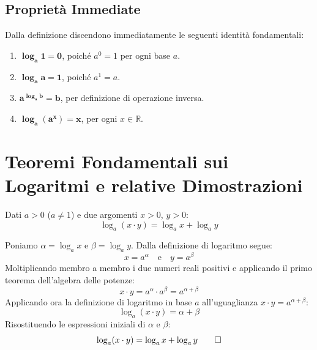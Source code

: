 \documentclass[11pt,a4paper,oneside]{report}
\begin{document}
\subsection{Proprietà Immediate}
Dalla definizione discendono immediatamente le seguenti identità fondamentali:
\begin{enumerate}
    \item $\mathbf{\log_a 1 = 0}$, poiché $a^0 = 1$ per ogni base $a$.
    \item $\mathbf{\log_a a = 1}$, poiché $a^1 = a$.
    \item $\mathbf{a^{\log_a b} = b}$, per definizione di operazione inversa.
    \item $\mathbf{\log_a (a^x) = x}$, per ogni $x \in \mathbb{R}$.
\end{enumerate}

\section{Teoremi Fondamentali sui Logaritmi e relative Dimostrazioni}

\begin{teorema}
Dati $a > 0$ ($a \neq 1$) e due argomenti $x > 0$, $y > 0$:
\begin{equation}
    \log_a (x \cdot y) = \log_a x + \log_a y
\end{equation}
\end{teorema}

\begin{dimostrazione}
Poniamo $\alpha = \log_a x$ e $\beta = \log_a y$.
Dalla definizione di logaritmo segue:
\begin{equation}
    x = a^\alpha \quad \text{e} \quad y = a^\beta
\end{equation}
Moltiplicando membro a membro i due numeri reali positivi e applicando il primo teorema dell'algebra delle potenze:
\begin{equation}
    x \cdot y = a^\alpha \cdot a^\beta = a^{\alpha + \beta}
\end{equation}
Applicando ora la definizione di logaritmo in base $a$ all'uguaglianza $x \cdot y = a^{\alpha + \beta}$:
\begin{equation}
    \log_a (x \cdot y) = \alpha + \beta
\end{equation}
Risostituendo le espressioni iniziali di $\alpha$ e $\beta$:
\begin{equation}
    \log_a (x \cdot y) = \log_a x + \log_a y \qedhere
\end{equation}
\end{dimostrazione}
\end{document}
